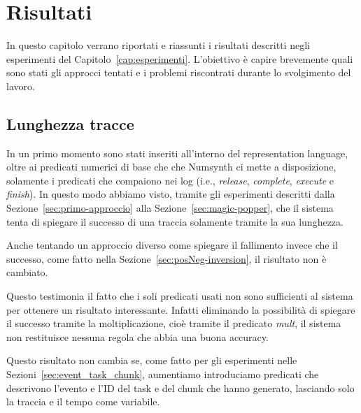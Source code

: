 \chapter{Risultati}
In questo capitolo verrano riportati e riassunti i risultati descritti negli esperimenti del Capitolo~\ref{cap:esperimenti}. L'obiettivo è capire brevemente quali sono stati gli approcci tentati e i problemi riscontrati durante lo svolgimento del lavoro.

\section{Lunghezza tracce}
In un primo momento sono stati inseriti all'interno del representation language, oltre ai predicati numerici di base che che Numsynth ci mette a disposizione, solamente i predicati che compaiono nei log (i.e., \textit{release}, \textit{complete}, \textit{execute} e \textit{finish}). In questo modo abbiamo visto, tramite gli esperimenti descritti dalla Sezione~\ref{sec:primo-approccio} alla Sezione~\ref{sec:magic-popper}, che il sistema tenta di spiegare il successo di una traccia solamente tramite la sua lunghezza.

Anche tentando un approccio diverso come spiegare il fallimento invece che il successo, come fatto nella Sezione~\ref{sec:posNeg-inversion}, il risultato non è cambiato.

Questo testimonia il fatto che i soli predicati usati non sono sufficienti al sistema per ottenere un risultato interessante. Infatti eliminando la possibilità di spiegare il successo tramite la moltiplicazione, cioè tramite il predicato \textit{mult}, il sistema non restituisce nessuna regola che abbia una buona accuracy.

Questo risultato non cambia se, come fatto per gli esperimenti nelle Sezioni~\ref{sec:event_task_chunk}, aumentiamo introduciamo predicati che descrivono l'evento e l'ID del task e del chunk che hanno generato, lasciando solo la traccia e il tempo come variabile.